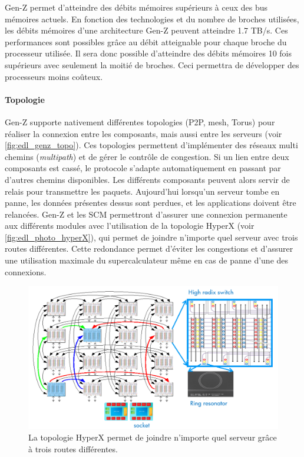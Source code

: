         Gen-Z permet d'atteindre des débits mémoires supérieurs à ceux des bus mémoires actuels. En fonction des technologies et du nombre de broches utilisées, les débits mémoires d'une architecture Gen-Z peuvent atteindre 1.7 TB/s. Ces performances sont possibles grâce au débit atteignable pour chaque broche du processeur utilisée. Il sera donc possible d'atteindre des débits mémoires 10 fois supérieurs avec seulement la moitié de broches. Ceci permettra de développer des processeurs moins coûteux.
        
            
            
            

    \paragraph{Topologie}

        Gen-Z supporte nativement différentes topologies (P2P, mesh, Torus) pour réaliser la connexion entre les composants, mais aussi entre les serveurs (voir \autoref{fig:edl_genz_topo}). Ces topologies permettent d'implémenter des réseaux multi chemins (\textit{multipath}) et de gérer le contrôle de congestion. Si un lien entre deux composants est cassé, le protocole s'adapte automatiquement en passant par d'autres chemins disponibles. Les différents composants peuvent alors servir de relais pour transmettre les paquets. Aujourd'hui lorsqu'un serveur tombe en panne, les données présentes dessus sont perdues, et les applications doivent être relancées. Gen-Z et les SCM permettront d'assurer une connexion permanente aux différents modules avec l'utilisation de la topologie HyperX \cite{Ahn2009} (voir \autoref{fig:edl_photo_hyperX}),  qui permet de joindre n'importe quel serveur avec trois routes différentes. Cette redondance permet d'éviter les congestions et d'assurer une utilisation maximale du supercalculateur même en cas de panne d'une des connexions.
             
        \begin{figure}
            \center
            \includegraphics[width=14cm]{images/edl_photo_hyperX.png}
            \caption{\label{fig:edl_photo_hyperX} La topologie HyperX permet de joindre n'importe quel serveur grâce à trois routes différentes.}
        \end{figure} 
            
